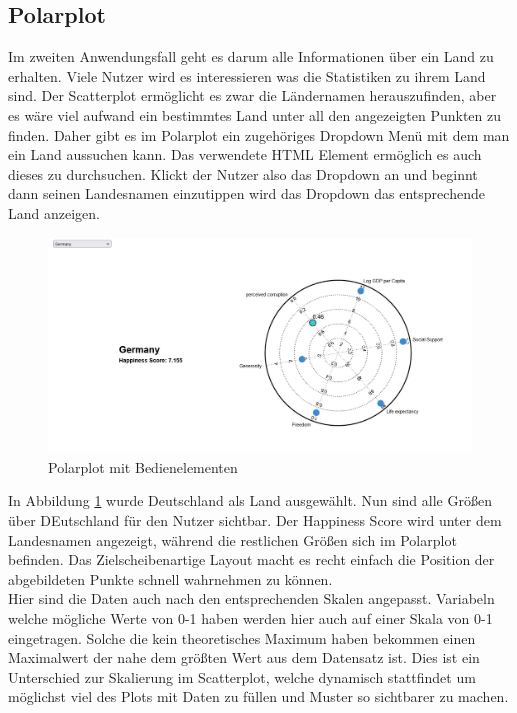 \subsection{Polarplot}

Im zweiten Anwendungsfall geht es darum alle Informationen über ein Land zu erhalten. Viele Nutzer wird es interessieren was die Statistiken zu ihrem Land sind. Der Scatterplot ermöglicht es zwar die Ländernamen herauszufinden, aber es wäre viel aufwand ein bestimmtes Land unter all den angezeigten Punkten zu finden. Daher gibt es im Polarplot ein zugehöriges Dropdown Menü mit dem man ein Land aussuchen kann. Das verwendete HTML Element ermöglich es auch dieses zu durchsuchen. Klickt der Nutzer also das Dropdown an und beginnt dann seinen Landesnamen einzutippen wird das Dropdown das entsprechende Land anzeigen. \\

\begin{figure}[h]
 \centering
 \includegraphics[width = \textwidth]{img/polarplot.jpg}
 \caption{Polarplot mit Bedienelementen}
 \label{fig:polar_example}
\end{figure}

In Abbildung \ref{fig:polar_example} wurde Deutschland als Land ausgewählt. Nun sind alle Größen über DEutschland für den Nutzer sichtbar. Der Happiness Score wird unter dem Landesnamen angezeigt, während die restlichen Größen sich im Polarplot befinden. Das Zielscheibenartige Layout macht es recht einfach die Position der abgebildeten Punkte schnell wahrnehmen zu können. \\

Hier sind die Daten auch nach den entsprechenden Skalen angepasst. Variabeln welche mögliche Werte von 0-1 haben werden hier auch auf einer Skala von 0-1 eingetragen. Solche die kein theoretisches Maximum haben bekommen einen Maximalwert der nahe dem größten Wert aus dem Datensatz ist. Dies ist ein Unterschied zur Skalierung im Scatterplot, welche dynamisch stattfindet um möglichst viel des Plots mit Daten zu füllen und Muster so sichtbarer zu machen. 

